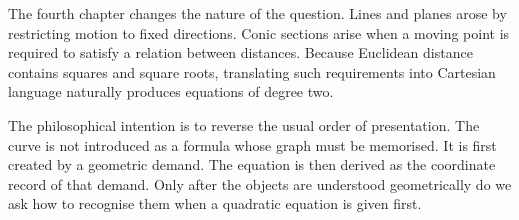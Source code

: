 The fourth chapter changes the nature of the question. Lines and planes arose by
restricting motion to fixed directions. Conic sections arise when a moving point
is required to satisfy a relation between distances. Because Euclidean distance
contains squares and square roots, translating such requirements into Cartesian
language naturally produces equations of degree two.

The philosophical intention is to reverse the usual order of presentation. The
curve is not introduced as a formula whose graph must be memorised. It is first
created by a geometric demand. The equation is then derived as the coordinate
record of that demand. Only after the objects are understood geometrically do we
ask how to recognise them when a quadratic equation is given first.
